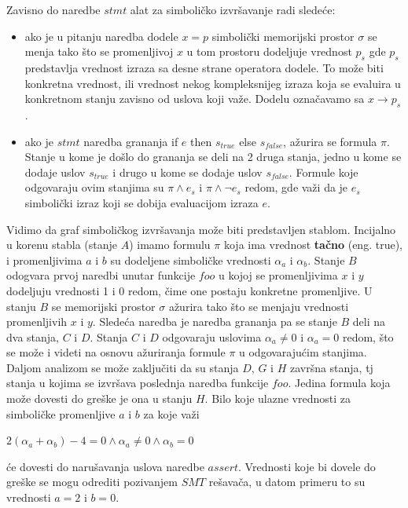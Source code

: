 \documentclass[12pt]{article}
\begin{document}
Zavisno do naredbe $stmt$ alat za simboličko izvršavanje radi sledeće:

\begin{itemize}
    \item ako je u pitanju naredba dodele $x = p$ simbolički memorijski prostor $\sigma$ se menja tako što se promenljivoj $x$ u tom prostoru dodeljuje vrednost $p_s$ gde $p_s$ predstavlja vrednost izraza sa desne strane operatora dodele. To može biti konkretna vrednost, ili vrednost nekog kompleksnijeg izraza koja se evaluira u konkretnom stanju zavisno od uslova koji važe. Dodelu označavamo sa $x \rightarrow p_s$.
    
    \item ako je $stmt$ naredba grananja if $e$ then $s_{true}$ else $s_{false}$, ažurira se formula $\pi$. Stanje u kome je došlo do grananja se deli na 2 druga stanja, jedno u kome se dodaje uslov $s_{true}$ i drugo u kome se dodaje uslov $s_{false}$. Formule koje odgovaraju ovim stanjima su $\pi \land e_s$ i $\pi \land \neg e_s$ redom, gde važi da je $e_s$ simbolički izraz koji se dobija evaluacijom izraza $e$.
\end{itemize}

Vidimo da graf simboličkog izvršavanja može biti predstavljen stablom. Incijalno u korenu stabla (stanje $A$) imamo formulu $\pi$ koja ima vrednost \textbf{tačno} (eng. true), i promenljivima $a$ i $b$ su dodeljene simboličke vrednosti $\alpha_a$ i $\alpha_b$. Stanje $B$ odogvara prvoj naredbi unutar funkcije $foo$ u kojoj se promenljivima $x$ i $y$ dodeljuju vrednosti 1 i 0 redom, čime one postaju konkretne promenljive. U stanju $B$ se memorijski prostor $\sigma$ ažurira tako što se menjaju vrednosti promenljivih $x$ i $y$. Sledeća naredba je naredba grananja pa se stanje $B$ deli na dva stanja, $C$ i $D$. Stanja $C$ i $D$ odgovaraju uslovima $\alpha_a \neq 0$ i $\alpha_a = 0$ redom, što se može i videti na osnovu ažuriranja formule $\pi$ u odgovarajućim stanjima. Daljom analizom se može zaključiti da su stanja $D$, $G$ i $H$ završna stanja, tj stanja u kojima se izvršava poslednja naredba funkcije $foo$. Jedina formula koja može dovesti do greške je ona u stanju $H$. Bilo koje ulazne vrednosti za simboličke promenljive $a$ i $b$ za koje važi
\vskip 0.2in
\centerline{$2(\alpha_a + \alpha_b) - 4 = 0 \land \alpha_a \neq 0 \land \alpha_b = 0$}
\vskip 0.2in
će dovesti do narušavanja uslova naredbe $assert$. Vrednosti koje bi dovele do greške se mogu odrediti pozivanjem $SMT$ rešavača, u datom primeru to su vrednosti $a = 2$ i $b = 0$.
\end{document}
